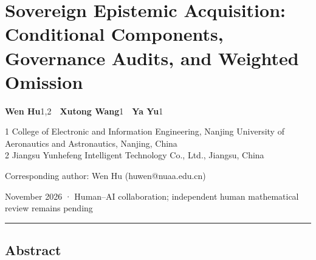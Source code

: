 \documentclass[
  11pt]{article}
\author{}
\date{17 November 2026}
\begin{document}
\section{Sovereign Epistemic Acquisition: Conditional Components,
Governance Audits, and Weighted
Omission}\label{sovereign-epistemic-acquisition-conditional-components-governance-audits-and-weighted-omission}

\textbf{Wen Hu}1,2~~\textbf{Xutong Wang}1~~\textbf{Ya Yu}1

1 College of Electronic and Information Engineering, Nanjing University
of Aeronautics and Astronautics, Nanjing, China\\
2 Jiangsu Yunhefeng Intelligent Technology Co., Ltd., Jiangsu, China

Corresponding author: Wen Hu (huwen@nuaa.edu.cn)

November 2026 · Human--AI collaboration; independent human mathematical
review remains pending

\begin{center}\rule{0.5\linewidth}{0.5pt}\end{center}

\subsection{Abstract}\label{abstract}
\end{document}
